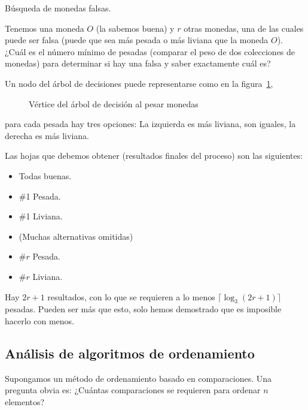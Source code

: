   \begin{example}
    Búsqueda de monedas falsas.

    Tenemos una moneda \(O\) (la sabemos buena)
    y \(r\) otras monedas,
    una de las cuales puede ser falsa
    (puede que sea más pesada o más liviana que la moneda \(O\)).
    ¿Cuál es el número mínimo de pesadas
    (comparar el peso de dos colecciones de monedas)
    para determinar si hay una falsa y saber exactamente cuál es?

    Un nodo del árbol de decisiones puede representarse
    como en la figura~\ref{fig:pesar-monedas},
    \begin{figure}[htbp]
      \centering
      \caption{Vértice del árbol de decisión al pesar monedas}
      \label{fig:pesar-monedas}
    \end{figure}
    para cada pesada hay tres opciones:
    La izquierda es más liviana,
    son iguales,
    la derecha es más liviana.

    Las hojas que debemos obtener
    (resultados finales del proceso)
    son las siguientes:
    \begin{itemize}
      \item
	Todas buenas.
      \item
	\#1 Pesada.
      \item
	\#1 Liviana.
      \item
	(Muchas alternativas omitidas)
      \item
	\#\(r\) Pesada.
      \item
	\#\(r\) Liviana.
    \end{itemize}
    Hay \(2 r + 1\) resultados,
    con lo que se requieren
    a lo menos \(\lceil \log_3 (2 r + 1) \rceil\) pesadas.
    Pueden ser más que esto,
    solo hemos demostrado que es imposible hacerlo con menos.
  \end{example}


\subsection{Análisis de algoritmos de ordenamiento}
\label{sec:arbol_ordenamiento}

  Supongamos un método de ordenamiento basado en comparaciones.
  Una pregunta obvia es:
  ¿Cuántas comparaciones se requieren para ordenar \(n\) elementos?

